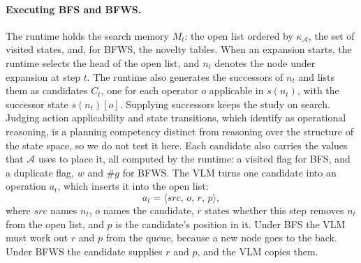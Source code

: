 
\paragraph{Executing BFS and BFWS.} The runtime holds the search memory $M_t$: the open list ordered by $\kappa_{\mathcal{A}}$, the set of visited states, and, for BFWS, the novelty tables. When an expansion starts, the runtime selects the head of the open list, and $n_t$ denotes the node under expansion at step $t$. The runtime also generates the successors of $n_t$ and lists them as candidates $C_t$, one for each operator $o$ applicable in $s(n_t)$, with the successor state $s(n_t)[o]$. Supplying successors keeps the study on search. Judging action applicability and state transitions, which \citet{huang2026twodistinct} identify as operational reasoning, is a planning competency distinct from reasoning over the structure of the state space, so we do not test it here. Each candidate also carries the values that $\mathcal{A}$ uses to place it, all computed by the runtime: a visited flag for BFS, and a duplicate flag, $w$ and $\#g$ for BFWS. The VLM turns one candidate into an operation $a_t$, which inserts it into the open list:
\begin{equation}
a_t = \langle \mathit{src},\, o,\, r,\, p \rangle,
\label{eq:operation}
\end{equation}
where $\mathit{src}$ names $n_t$, $o$ names the candidate, $r$ states whether this step removes $n_t$ from the open list, and $p$ is the candidate's position in it. Under BFS the VLM must work out $r$ and $p$ from the queue, because a new node goes to the back. Under BFWS the candidate supplies $r$ and $p$, and the VLM copies them.

